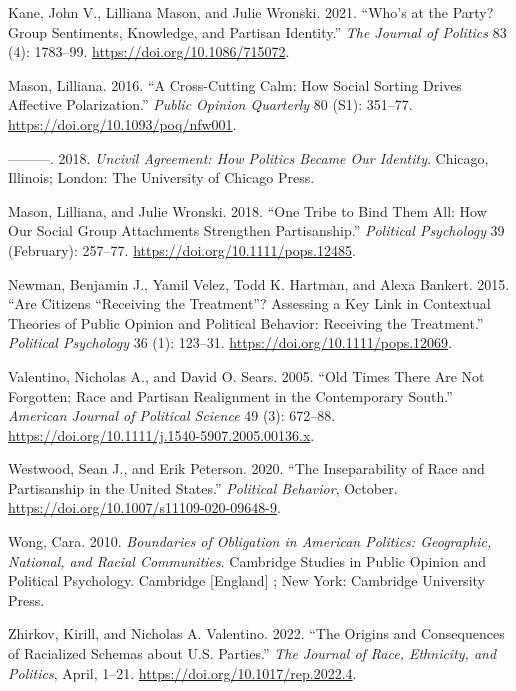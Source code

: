 \documentclass[
  12pt,
]{article}
\newlength{\cslhangindent}
\newlength{\cslentryspacingunit} %
\newenvironment{CSLReferences}[2] %
 {%
  \setlength{\parindent}{0pt}
  \ifodd #1
  \let\oldpar\par
  \def\par{\hangindent=\cslhangindent\oldpar}
  \fi
  \setlength{\parskip}{#2\cslentryspacingunit}
 }%
 {}
\begin{document}
\begin{CSLReferences}{1}{0}
\leavevmode{}%
Kane, John V., Lilliana Mason, and Julie Wronski. 2021. {``Who{'}s at
the Party? Group Sentiments, Knowledge, and Partisan Identity.''}
\emph{The Journal of Politics} 83 (4): 1783--99.
\url{https://doi.org/10.1086/715072}.

\leavevmode{}%
Mason, Lilliana. 2016. {``A Cross-Cutting Calm: How Social Sorting
Drives Affective Polarization.''} \emph{Public Opinion Quarterly} 80
(S1): 351--77. \url{https://doi.org/10.1093/poq/nfw001}.

\leavevmode{}%
---------. 2018. \emph{Uncivil Agreement: How Politics Became Our
Identity}. Chicago, Illinois; London: The University of Chicago Press.

\leavevmode{}%
Mason, Lilliana, and Julie Wronski. 2018. {``One Tribe to Bind Them All:
How Our Social Group Attachments Strengthen Partisanship.''}
\emph{Political Psychology} 39 (February): 257--77.
\url{https://doi.org/10.1111/pops.12485}.

\leavevmode{}%
Newman, Benjamin J., Yamil Velez, Todd K. Hartman, and Alexa Bankert.
2015. {``Are Citizens {``}Receiving the Treatment{''}? Assessing a Key
Link in Contextual Theories of Public Opinion and Political Behavior:
Receiving the Treatment.''} \emph{Political Psychology} 36 (1): 123--31.
\url{https://doi.org/10.1111/pops.12069}.

\leavevmode{}%
Valentino, Nicholas A., and David O. Sears. 2005. {``Old Times There Are
Not Forgotten: Race and Partisan Realignment in the Contemporary
South.''} \emph{American Journal of Political Science} 49 (3): 672--88.
\url{https://doi.org/10.1111/j.1540-5907.2005.00136.x}.

\leavevmode{}%
Westwood, Sean J., and Erik Peterson. 2020. {``The Inseparability of
Race and Partisanship in the United States.''} \emph{Political
Behavior}, October. \url{https://doi.org/10.1007/s11109-020-09648-9}.

\leavevmode{}%
Wong, Cara. 2010. \emph{Boundaries of Obligation in American Politics:
Geographic, National, and Racial Communities}. Cambridge Studies in
Public Opinion and Political Psychology. Cambridge {[}England{]} ; New
York: Cambridge University Press.

\leavevmode{}%
Zhirkov, Kirill, and Nicholas A. Valentino. 2022. {``The Origins and
Consequences of Racialized Schemas about U.S. Parties.''} \emph{The
Journal of Race, Ethnicity, and Politics}, April, 1--21.
\url{https://doi.org/10.1017/rep.2022.4}.

\end{CSLReferences}
\end{document}
